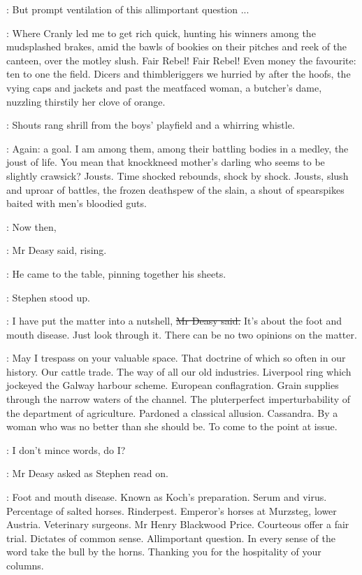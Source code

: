 \deasy:
But prompt ventilation of this allimportant question ...

\StephenInt:
Where Cranly led me to get rich quick,
hunting his winners among the mudsplashed brakes,
amid the bawls of bookies on their pitches and reek of the canteen,
over the motley slush.
Fair Rebel!
Fair Rebel!
Even money the favourite:
ten to one the field.
Dicers and thimbleriggers we hurried by after the hoofs,
the vying caps and jackets
and past the meatfaced woman,
a butcher's dame,
nuzzling thirstily her clove of orange.

:
Shouts rang shrill from the boys' playfield and a whirring whistle.

\StephenInt:
Again: a goal.
I am among them, among their battling bodies in a medley,
the joust of life.
You mean that knockkneed mother's darling who seems to be slightly crawsick?
Jousts.
Time shocked rebounds, shock by shock.
Jousts, slush and uproar of battles, the frozen deathspew of the slain,
a shout of spearspikes baited with men's bloodied guts.

\deasy:
Now then,

:
Mr Deasy said, rising.

:
He came to the table, pinning together his sheets.

:
Stephen stood up.

\deasy:
I have put the matter into a nutshell, \sout{Mr Deasy said.}
It's about the foot and mouth disease.
Just look through it.
There can be no two opinions on the matter.

\StephenInt: 
May I trespass on your valuable space.
That doctrine of  which so often in our history.
Our cattle trade.
The way of all our old industries.
Liverpool ring which jockeyed the Galway harbour scheme.
European conflagration.
Grain supplies through the narrow waters of the channel.
The pluterperfect imperturbability of the department of agriculture.
Pardoned a classical allusion.
Cassandra.
By a woman who was no better than she should be.
To come to the point at issue.

\deasy:
I don't mince words, do I?

:
Mr Deasy asked as Stephen read on.

\StephenInt: 
Foot and mouth disease.
Known as Koch's preparation.
Serum and virus.
Percentage of salted horses.
Rinderpest.
Emperor's horses at Murzsteg, lower Austria.
Veterinary surgeons.
Mr Henry Blackwood Price.
Courteous offer a fair trial.
Dictates of common sense.
Allimportant question.
In every sense of the word take the bull by the horns.
Thanking you for the hospitality of your columns.

